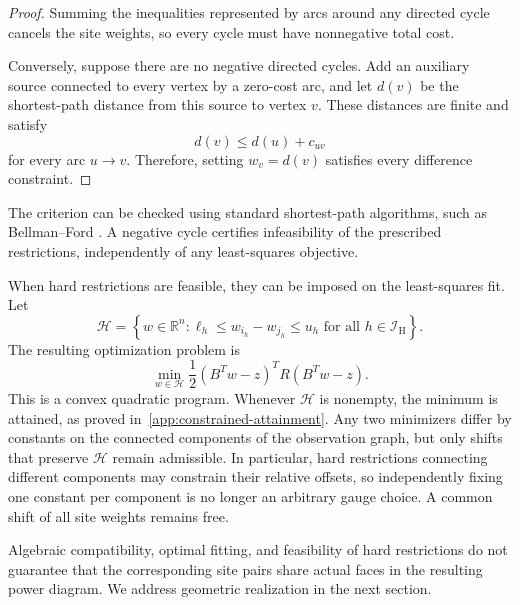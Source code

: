 \begin{proof}
Summing the inequalities represented by arcs around any directed cycle cancels the site weights, so every cycle must have nonnegative total cost.

Conversely, suppose there are no negative directed cycles. Add an auxiliary source connected to every vertex by a zero-cost arc, and let $d(v)$ be the shortest-path distance from this source to vertex $v$. These distances are finite and satisfy
\begin{equation}
d(v)\le d(u)+c_{uv}
\end{equation}
for every arc $u\to v$. Therefore, setting $w_v=d(v)$ satisfies every difference constraint.
\end{proof}

The criterion can be checked using standard shortest-path algorithms, such as Bellman--Ford \citep{Bellman1958}. A negative cycle certifies infeasibility of the prescribed restrictions, independently of any least-squares objective.

When hard restrictions are feasible, they can be imposed on the least-squares fit. Let
\begin{equation}
\mathcal H=\left\{w\in\mathbb R^n:
\ell_h\le w_{i_h}-w_{j_h}\le u_h
\text{ for all }h\in\mathcal I_{\mathrm H}\right\}.
\label{eq:hard-feasible-set}
\end{equation}
The resulting optimization problem is
\begin{equation}
\boxed{
\min_{w\in\mathcal H}
\frac12(B^Tw-z)^TR(B^Tw-z).
}
\label{eq:hard-constrained-fit}
\end{equation}
This is a convex quadratic program. Whenever $\mathcal H$ is nonempty, the minimum is attained, as proved in~\ref{app:constrained-attainment}. Any two minimizers differ by constants on the connected components of the observation graph, but only shifts that preserve $\mathcal H$ remain admissible. In particular, hard restrictions connecting different components may constrain their relative offsets, so independently fixing one constant per component is no longer an arbitrary gauge choice. A common shift of all site weights remains free.

Algebraic compatibility, optimal fitting, and feasibility of hard restrictions do not guarantee that the corresponding site pairs share actual faces in the resulting power diagram. We address geometric realization in the next section.
